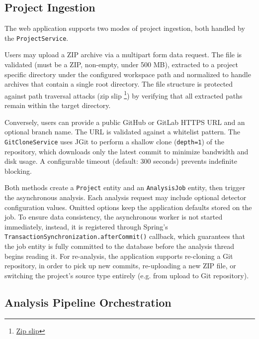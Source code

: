 \subsection{Project Ingestion}
\label{subsec:project-ingestion}

\par The web application supports two modes of project ingestion, both handled by the \texttt{ProjectService}.

\par Users may upload a ZIP archive via a multipart form data request. The file is validated (must be a ZIP, non-empty, under 500 MB), extracted to a project specific directory under the configured workspace path and normalized to handle archives that contain a single root directory. The file structure is protected against path traversal attacks (zip slip \footnote{\href{https://maven.apache.org/security-plexus-archiver.html}{Zip slip}}) by verifying that all extracted paths remain within the target directory.

\par Conversely, users can provide a public GitHub or GitLab HTTPS URL and an optional branch name. The URL is validated against a whitelist pattern. The \texttt{Git\-Clone\-Ser\-vice} uses JGit to perform a shallow clone (\texttt{depth=1}) of the repository, which downloads only the latest commit to minimize bandwidth and disk usage. A configurable timeout (default: 300 seconds) prevents indefinite blocking.

Both methods create a \texttt{Project} entity and an \texttt{AnalysisJob} entity, then trigger the asynchronous analysis. Each analysis request may include optional detector configuration values. Omitted options keep the application defaults stored on the job. To ensure data consistency, the asynchronous worker is not started immediately, instead, it is registered through Spring's \texttt{Tran\-sac\-tionSyn\-chron\-i\-zation.afterCommit()} callback, which guarantees that the job entity is fully committed to the database before the analysis thread begins reading it. For re-analysis, the application supports re-cloning a Git repository, in order to pick up new commits, re-uploading a new ZIP file, or switching the project's source type entirely (e.g. from upload to Git repository).

\subsection{Analysis Pipeline Orchestration}
\label{subsec: analysis-pipeline}

